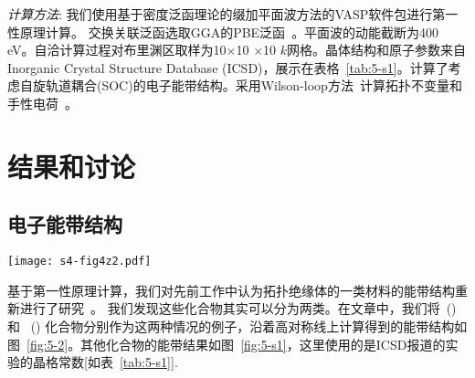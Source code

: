 {\it{计算方法}}: 
我们使用基于密度泛函理论的缀加平面波方法\citep{paw1,paw2}的VASP软件包\citep{KRESSE199615,vasp}进行第一性原理计算。
 交换关联泛函选取GGA的PBE泛函~\citep{pbe}。平面波的动能截断为400 eV。自洽计算过程对布里渊区取样为10$\times$10 $\times$10 $k$网格。晶体结构和原子参数来自Inorganic Crystal Structure Database (ICSD)，展示在表格~\ref{tab:5-s1}。计算了考虑自旋轨道耦合(SOC)的电子能带结构。采用Wilson-loop方法~\citep{Yu2011An}计算拓扑不变量和手性电荷~\citep{Fang92}。


\section{结果和讨论}
\subsection{电子能带结构}
\begin{figure*}[!htb]
    \centering
    \texttt{[image: s4-fig4z2.pdf]}
     \label{fig:5-s2}
    \end{figure*}
    
基于第一性原理计算，我们对先前工作中认为拓扑绝缘体的一类材料的能带结构重新进行了研究~\citep{Wang2010}。
我们发现这些化合物其实可以分为两类。在文章中，我们将\tic~(\tii) 和 \wsmc~(\wsm) 化合物分别作为这两种情况的例子，沿着高对称线上计算得到的能带结构如图~\ref{fig:5-2}。其他化合物的能带结果如图~\ref{fig:5-s1}，这里使用的是ICSD报道的实验的晶格常数[如表~\ref{tab:5-s1}].


